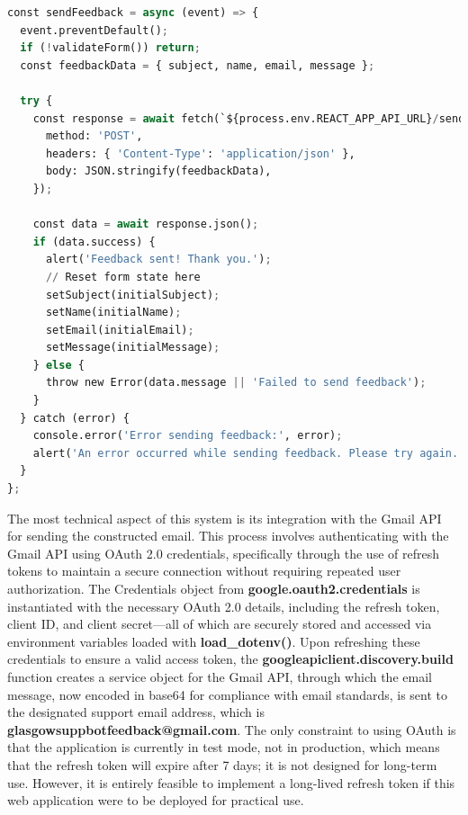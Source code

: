 \documentclass{l4proj}
\begin{document}
\begin{lstlisting}[language=Python, caption={sendFeedback Function}, label={sendFeedback Function}]
const sendFeedback = async (event) => {
  event.preventDefault();
  if (!validateForm()) return;
  const feedbackData = { subject, name, email, message };

  try {
    const response = await fetch(`${process.env.REACT_APP_API_URL}/send-email`, {
      method: 'POST',
      headers: { 'Content-Type': 'application/json' },
      body: JSON.stringify(feedbackData),
    });
    
    const data = await response.json();
    if (data.success) {
      alert('Feedback sent! Thank you.');
      // Reset form state here
      setSubject(initialSubject);
      setName(initialName);
      setEmail(initialEmail);
      setMessage(initialMessage);
    } else {
      throw new Error(data.message || 'Failed to send feedback');
    }
  } catch (error) {
    console.error('Error sending feedback:', error);
    alert('An error occurred while sending feedback. Please try again.');
  }
};
\end{lstlisting}


The most technical aspect of this system is its integration with the Gmail API for sending the constructed email. This process involves authenticating with the Gmail API using OAuth 2.0 credentials, specifically through the use of refresh tokens to maintain a secure connection without requiring repeated user authorization. The Credentials object from \textbf{google.oauth2.credentials} is instantiated with the necessary OAuth 2.0 details, including the refresh token, client ID, and client secret—all of which are securely stored and accessed via environment variables loaded with \textbf{load\_dotenv()}. Upon refreshing these credentials to ensure a valid access token, the \textbf{googleapiclient.discovery.build} function creates a service object for the Gmail API, through which the email message, now encoded in base64 for compliance with email standards, is sent to the designated support email address, which is \textbf{glasgowsuppbotfeedback@gmail.com}. The only constraint to using OAuth is that the application is currently in test mode, not in production, which means that the refresh token will expire after 7 days; it is not designed for long-term use. However, it is entirely feasible to implement a long-lived refresh token if this web application were to be deployed for practical use.
\end{document}
